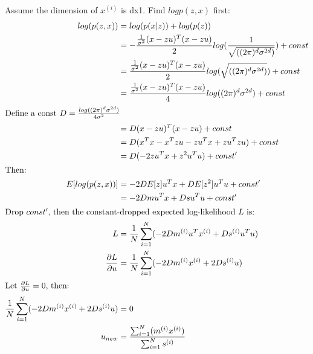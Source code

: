 \documentclass{article}
\begin{document}
\subsection{}
Assume the dimension of $x^{(i)}$ is dx1. Find $logp(z,x)$ first:
\begin{align*}
    log(p(z,x)) &= log(p(x|z))+log(p(z))\\
    &= -\frac{\frac{1}{\sigma ^2}(x-zu)^T(x-zu)}{2}log(\frac{1}{\sqrt{((2\pi )^d\sigma ^{2d})}}) + const\\
    &= \frac{\frac{1}{\sigma ^2}(x-zu)^T(x-zu)}{2}log(\sqrt{((2\pi )^d\sigma ^{2d})}) + const\\
    &= \frac{\frac{1}{\sigma ^2}(x-zu)^T(x-zu)}{4}log((2\pi )^d\sigma ^{2d}) + const\\
\intertext{Define a const $D = \frac{log((2\pi )^d\sigma ^{2d})}{4\sigma ^2}$}
    &=D(x-zu)^T(x-zu) + const\\
    &=D(x^Tx-x^Tzu-zu^Tx+zu^Tzu) + const\\
    &=D(-2zu^Tx+z^2u^Tu) + const^\prime\\
\intertext{Then:}
    E[log(p(z,x))] &= -2DE[z]u^Tx + DE[z^2]u^Tu + const^\prime\\
                 &= -2Dmu^Tx + Dsu^Tu + const^\prime\\
\intertext{Drop $const^\prime$, then the constant-dropped expected log-likelihood $L$ is:}
    L &= \frac{1}{N}\sum_{i = 1}^{N}(-2Dm^{(i)}u^Tx^{(i)} + Ds^{(i)}u^Tu)\\
    \frac{\partial L}{\partial u} &= \frac{1}{N}\sum_{i = 1}^{N}(-2Dm^{(i)}x^{(i)} + 2Ds^{(i)}u)\\
\intertext{Let $\frac{\partial L}{\partial u} = 0$, then:}
    \frac{1}{N}\sum_{i = 1}^{N}(-2Dm^{(i)}x^{(i)} + 2Ds^{(i)}u) &= 0\\
    u_{new} &= \frac{\sum_{i = 1}^{N}(m^{(i)}x^{(i)})}{\sum_{i = 1}^{N}s^{(i)}}\\
\end{align*}
\end{document}
